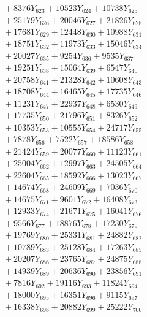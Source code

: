 \documentclass[a4paper,10pt]{article}
\begin{document}
{\begin{align}
&\;  + 8376 Y_{623} + 10523 Y_{624} + 10738 Y_{625} \\[0.3ex]
&\;  + 25179 Y_{626} + 20046 Y_{627} + 21826 Y_{628} \\[0.5ex]\allowbreak
&\;  + 17681 Y_{629} + 12448 Y_{630} + 10988 Y_{631} \\[0.3ex]
&\;  + 18751 Y_{632} + 11973 Y_{633} + 15046 Y_{634} \\[0.3ex]
&\;  + 20027 Y_{635} + 9254 Y_{636} + 9535 Y_{637} \\[0.3ex]
&\;  + 19251 Y_{638} + 15064 Y_{639} + 6547 Y_{640} \\[0.3ex]
&\;  + 20758 Y_{641} + 21328 Y_{642} + 10608 Y_{643} \\[0.3ex]
&\;  + 18708 Y_{644} + 16465 Y_{645} + 17735 Y_{646} \\[0.3ex]
&\;  + 11231 Y_{647} + 22937 Y_{648} + 6530 Y_{649} \\[0.3ex]
&\;  + 17735 Y_{650} + 21796 Y_{651} + 8326 Y_{652} \\[0.3ex]
&\;  + 10353 Y_{653} + 10555 Y_{654} + 24717 Y_{655} \\[0.3ex]
&\;  + 7878 Y_{656} + 7522 Y_{657} + 18586 Y_{658} \\[0.5ex]\allowbreak
&\;  + 21424 Y_{659} + 20077 Y_{660} + 11123 Y_{661} \\[0.3ex]
&\;  + 25004 Y_{662} + 12997 Y_{663} + 24505 Y_{664} \\[0.3ex]
&\;  + 22604 Y_{665} + 18592 Y_{666} + 13023 Y_{667} \\[0.3ex]
&\;  + 14674 Y_{668} + 24609 Y_{669} + 7036 Y_{670} \\[0.3ex]
&\;  + 14675 Y_{671} + 9601 Y_{672} + 16408 Y_{673} \\[0.3ex]
&\;  + 12933 Y_{674} + 21671 Y_{675} + 16041 Y_{676} \\[0.3ex]
&\;  + 9566 Y_{677} + 18876 Y_{678} + 17230 Y_{679} \\[0.3ex]
&\;  + 19769 Y_{680} + 25331 Y_{681} + 24882 Y_{682} \\[0.3ex]
&\;  + 10789 Y_{683} + 25128 Y_{684} + 17263 Y_{685} \\[0.3ex]
&\;  + 20207 Y_{686} + 23765 Y_{687} + 24875 Y_{688} \\[0.5ex]\allowbreak
&\;  + 14939 Y_{689} + 20636 Y_{690} + 23856 Y_{691} \\[0.3ex]
&\;  + 7816 Y_{692} + 19116 Y_{693} + 11824 Y_{694} \\[0.3ex]
&\;  + 18000 Y_{695} + 16351 Y_{696} + 9115 Y_{697} \\[0.3ex]
&\;  + 16338 Y_{698} + 20882 Y_{699} + 25222 Y_{700} \\[0.3ex]

\end{align}}
\end{document}
